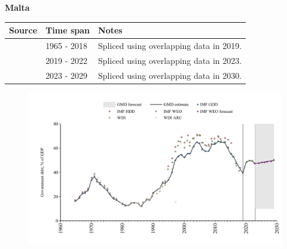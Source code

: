 \documentclass[12pt,a4paper,landscape]{article}
\begin{document}
\begin{adjustbox}{max totalsize={\paperwidth}{\paperheight},center}
\begin{minipage}[t][\textheight][t]{\textwidth}
\vspace*{0.5cm}
{}
\begin{center}
{\Large\bfseries Malta}
\end{center}
\vspace{0.5cm}
\begin{table}[H]
\centering
\small
\begin{tabular}{|l|l|l|}
\hline
\textbf{Source} & \textbf{Time span} & \textbf{Notes} \\
\hline
\rowcolor{white}\cite{IMF_GDD}& 1965 - 2018 &Spliced using overlapping data in 2019.\\
\rowcolor{lightgray}\cite{IMF_WEO}& 2019 - 2022 &Spliced using overlapping data in 2023.\\
\rowcolor{white}\cite{IMF_WEO_forecast}& 2023 - 2029 &Spliced using overlapping data in 2030.\\
\hline
\end{tabular}
\end{table}
\begin{figure}[H]
\centering
\includegraphics[width=\textwidth,height=0.6\textheight,keepaspectratio]{graphs/MLT_govdebt_GDP.pdf}
\end{figure}
\end{minipage}
\end{adjustbox}
\end{document}
